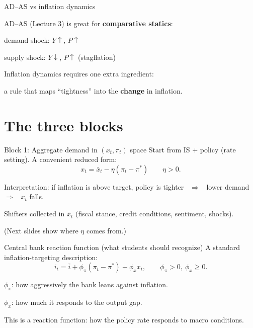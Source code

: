 \documentclass[aspectratio=169,xcolor=dvipsnames]{beamer}
\let\tempone\itemize
\let\temptwo\enditemize
\renewenvironment{itemize}{\tempone\addtolength{\itemsep}{\fill}}{\temptwo}
\begin{document}
\begin{frame}{AD--AS vs inflation dynamics}
\begin{itemize}
\item AD--AS (Lecture 3) is great for \textbf{comparative statics}:
\begin{itemize}
\item demand shock: $Y\uparrow$, $P\uparrow$
\item supply shock: $Y\downarrow$, $P\uparrow$ (stagflation)
\end{itemize}
\item Inflation dynamics requires one extra ingredient:
\begin{itemize}
\item a rule that maps ``tightness'' into the \textbf{change} in inflation.
\end{itemize}
\end{itemize}
\end{frame}

\section{The three blocks}

\begin{frame}{Block 1: Aggregate demand in $(x_t,\pi_t)$ space}
\small
Start from IS + policy (rate setting). A convenient reduced form:
\[
x_t = \bar x_t - \eta(\pi_t-\pi^\ast)
\qquad \eta>0.
\]
\begin{itemize}
\item Interpretation: if inflation is above target, policy is tighter \ $\Rightarrow$ \ lower demand \ $\Rightarrow$ \ $x_t$ falls.
\item Shifters collected in $\bar x_t$ (fiscal stance, credit conditions, sentiment, shocks).
\end{itemize}

\vspace{0.3em}
\small
(Next slides show where $\eta$ comes from.)
\end{frame}

\begin{frame}{Central bank reaction function (what students should recognize)}
\small
A standard inflation-targeting description:
\[
i_t = \bar i + \phi_\pi(\pi_t-\pi^\ast) + \phi_x x_t,
\qquad \phi_\pi>0,\ \phi_x\ge 0.
\]
\begin{itemize}
\item \textbf{$\phi_\pi$}: how aggressively the bank leans against inflation.
\item \textbf{$\phi_x$}: how much it responds to the output gap.
\item This is a reaction function: how the policy rate responds to macro conditions.
\end{itemize}
\end{frame}
\end{document}
